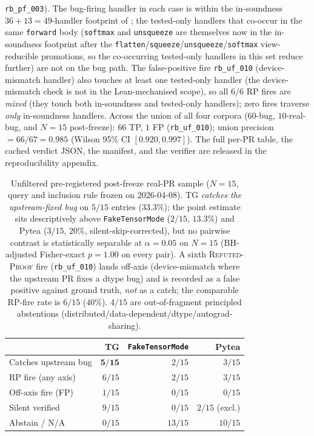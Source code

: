 \texttt{rb\_pf\_003}). The bug-firing handler in each case is
within the in-soundness $36{+}13{=}49$-handler footprint of
; the tested-only handlers that co-occur in
the same \texttt{forward} body
(\texttt{softmax} and \texttt{unsqueeze} are themselves now in
the in-soundness footprint after the
\texttt{flatten}/\texttt{squeeze}/\texttt{unsqueeze}/\texttt{softmax}
view-reducible promotions, so the co-occurring tested-only
handlers in this set reduce further)
are not on the bug path.
The false-positive fire \texttt{rb\_uf\_010} (device-mismatch
handler) also touches at least one tested-only handler
(the device-mismatch check is not in the Lean-mechanised scope),
so all $6/6$ RP fires are \emph{mixed} (they touch both
in-soundness and tested-only handlers); zero fires traverse
\emph{only} in-soundness handlers.
Across the union of all four corpora ($60$-bug, $10$-real-bug,
and $N{=}15$ post-freeze): $66$ TP, $1$ FP (\texttt{rb\_uf\_010});
union precision $= 66/67 = 0.985$ (Wilson 95\% CI $[0.920, 0.997]$).
The full per-PR table, the cached verdict JSON, the manifest, and the
verifier are released in the reproducibility appendix.

\begin{table}[t]
\centering\small\setlength{\tabcolsep}{4pt}
\caption{Unfiltered pre-registered post-freeze real-PR sample
($N{=}15$, query and inclusion rule frozen on 2026-04-08).
\textsc{TG} \emph{catches the upstream-fixed bug} on $5/15$
entries ($33.3\%$); the point estimate sits descriptively above
\texttt{FakeTensorMode}
($2/15$, $13.3\%$) and Pytea
($3/15$, $20\%$, silent-skip-corrected), but no pairwise contrast
is statistically separable at $\alpha{=}0.05$ on $N{=}15$
(BH-adjusted Fisher-exact $p{=}1.00$ on every pair). A sixth
\textsc{Refuted-Proof} fire (\texttt{rb\_uf\_010}) lands
off-axis (device-mismatch where the upstream PR fixes a
dtype bug) and is recorded as a false positive against
ground truth, \emph{not} as a catch; the comparable
RP-fire rate is $6/15$ ($40\%$). $4/15$ are out-of-fragment
principled abstentions (distributed/data-dependent/dtype/autograd-sharing).}
\label{tab:unfiltered-postfreeze}
\begin{tabular}{l rrr}
\toprule
 & \textsc{TG} & \texttt{FakeTensorMode} & Pytea \\
\midrule
Catches upstream bug & $\mathbf{5/15}$ & $2/15$ & $3/15$ \\
RP fire (any axis) & $6/15$ & $2/15$ & $3/15$ \\
Off-axis fire (FP) & $1/15$ & $0/15$ & $0/15$ \\
Silent verified & $9/15$ & $0/15$ & $2/15$ (excl.) \\
Abstain / N/A & $0/15$ & $13/15$ & $10/15$ \\
\bottomrule
\end{tabular}
\end{table}


